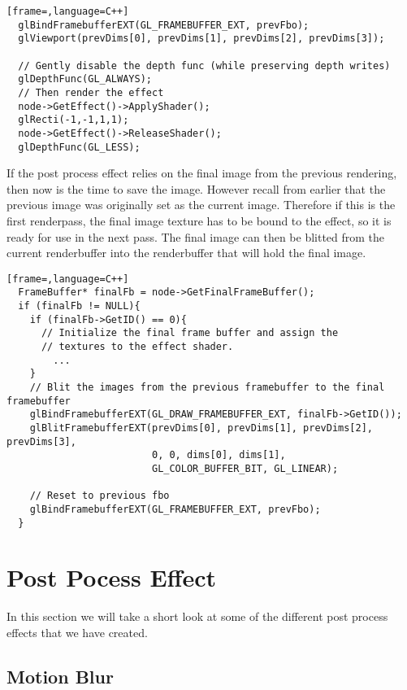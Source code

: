 \begin{lstlisting}[frame=,language=C++]
  glBindFramebufferEXT(GL_FRAMEBUFFER_EXT, prevFbo);
  glViewport(prevDims[0], prevDims[1], prevDims[2], prevDims[3]);
  
  // Gently disable the depth func (while preserving depth writes)
  glDepthFunc(GL_ALWAYS);
  // Then render the effect
  node->GetEffect()->ApplyShader();
  glRecti(-1,-1,1,1);
  node->GetEffect()->ReleaseShader();
  glDepthFunc(GL_LESS);
\end{lstlisting}


If the post process effect relies on the final image from the previous
rendering, then now is the time to save the image. However recall from
earlier that the previous image was originally set as the current
image. Therefore if this is the first renderpass, the final image
texture has to be bound to the effect, so it is ready for use in the
next pass. The final image can then be blitted from the current
renderbuffer into the renderbuffer that will hold the final image.

\begin{lstlisting}[frame=,language=C++]
  FrameBuffer* finalFb = node->GetFinalFrameBuffer();
  if (finalFb != NULL){
    if (finalFb->GetID() == 0){
      // Initialize the final frame buffer and assign the
      // textures to the effect shader.
        ...
    }
    // Blit the images from the previous framebuffer to the final framebuffer
    glBindFramebufferEXT(GL_DRAW_FRAMEBUFFER_EXT, finalFb->GetID());
    glBlitFramebufferEXT(prevDims[0], prevDims[1], prevDims[2], prevDims[3], 
                         0, 0, dims[0], dims[1], 
                         GL_COLOR_BUFFER_BIT, GL_LINEAR);
    
    // Reset to previous fbo
    glBindFramebufferEXT(GL_FRAMEBUFFER_EXT, prevFbo);
  }
\end{lstlisting}

\section{Post Pocess Effect}

In this section we will take a short look at some of the different
post process effects that we have created.

\subsection{Motion Blur}

